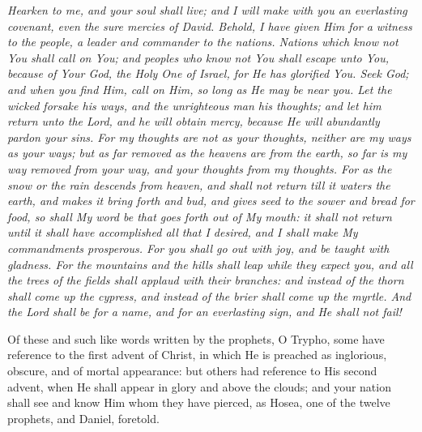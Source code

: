 \documentclass[9pt, twocolumn, oneside, a4paper]{memoir}
\begin{document}
\textit{Hearken to me, and your soul shall live; and I will make with you an everlasting covenant, even the sure mercies of David. Behold, I have given Him for a witness to the people, a leader and commander to the nations. Nations which know not You shall call on You; and peoples who know not You shall escape unto You, because of Your God, the Holy One of Israel, for He has glorified You. Seek God; and when you find Him, call on Him, so long as He may be near you. Let the wicked forsake his ways, and the unrighteous man his thoughts; and let him return unto the Lord, and he will obtain mercy, because He will abundantly pardon your sins. For my thoughts are not as your thoughts, neither are my ways as your ways; but as far removed as the heavens are from the earth, so far is my way removed from your way, and your thoughts from my thoughts. For as the snow or the rain descends from heaven, and shall not return till it waters the earth, and makes it bring forth and bud, and gives seed to the sower and bread for food, so shall My word be that goes forth out of My mouth: it shall not return until it shall have  accomplished all that I desired, and I shall make My commandments prosperous. For you shall go out with joy, and be taught with gladness. For the mountains and the hills shall leap while they expect you, and all the trees of the fields shall applaud with their branches: and instead of the thorn shall come up the cypress, and instead of the brier shall come up the myrtle. And the Lord shall be for a name, and for an everlasting sign, and He shall not fail! }

Of these and such like words written by the prophets, O Trypho, some have reference to the first advent of Christ, in which He is preached as inglorious, obscure, and of mortal appearance: but others had reference to His second advent, when He shall appear in glory and above the clouds; and your nation shall see and know Him whom they have pierced, as Hosea, one of the twelve prophets, and Daniel, foretold.
\end{document}
